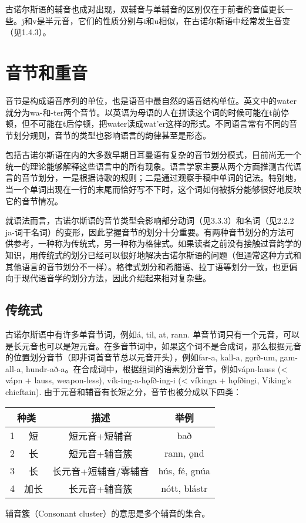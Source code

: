 古诺尔斯语的辅音也成对出现，双辅音与单辅音的区别仅在于前者的音值更长一些。j和v是半元音，它们的性质分别与i和u相似，在古诺尔斯语中经常发生音变（见1.4.3）。

\section{音节和重音}
\label{sec:accent}

音节是构成语音序列的单位，也是语音中最自然的语音结构单位。英文中的water就分为wa-和-ter两个音节。以英语为母语的人在拼读这个词的时候可能在t前停顿，但不可能在t后停顿，把water读成wat'er这样的形式。不同语言常有不同的音节划分规则，音节的类型也影响语言的韵律甚至是形态。

包括古诺尔斯语在内的大多数早期日耳曼语有复杂的音节划分模式，目前尚无一个统一的理论能够解释这些语言中的所有现象。语言学家主要从两个方面推测古代语言的音节划分，一是根据诗歌的规则；二是通过观察手稿中单词的记法。特别地，当一个单词出现在一行的末尾而恰好写不下时，这个词如何被拆分能够很好地反映它的音节情况。

就语法而言，古诺尔斯语的音节类型会影响部分动词（见3.3.3）和名词（见2.2.2 ja-词干名词）的变形，因此掌握音节的划分十分重要。有两种音节划分的方法可供参考，一种称为传统式，另一种称为格律式。如果读者之前没有接触过音韵学的知识，用传统式的划分已经可以很好地解决古诺尔斯语的问题（但通常这种方式和其他语言的音节划分不一样）。格律式划分和希腊语、拉丁语等划分一致，也更偏向于现代语音学的划分方法，因此介绍起来相对复杂些。

\subsection*{传统式}

古诺尔斯语中有许多单音节词，例如á, til, at, rann. 单音节词只有一个元音，可以是长元音也可以是短元音。在多音节词中，如果这个词不是合成词，那么根据元音的位置划分音节（即非词首音节总以元音开头），例如far-a, kall-a, gǫrð-um, gam-all-a, hundr-að-a。在合成词中，根据组词的语素划分音节，例如vápn-lauss (< vápn + lauss, weapon-less), vík-ing-a-hǫfð-ing-i (< víkinga + hǫfðingi, Viking's chieftain). 由于元音和辅音有长短之分，音节也被分成以下四类：

\begin{table}[H]
    \centering
    \begin{tabular}{@{}cccc@{}}
        \toprule
        \multicolumn{2}{c}{种类} & 描述 & 举例                                  \\ \midrule
        1                        & 短   & 短元音+短辅音        & bað            \\
        2                        & 长   & 短元音+辅音簇        & rann, ǫnd      \\
        3                        & 长   & 长元音+短辅音/零辅音 & hús, fé, gnúa  \\
        4                        & 加长 & 长元音+辅音簇        & nótt,   blástr \\ \bottomrule
    \end{tabular}
\end{table}
辅音簇（Consonant cluster）的意思是多个辅音的集合。

